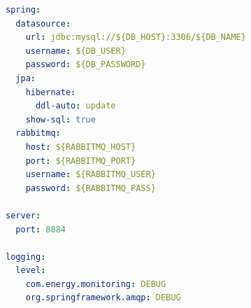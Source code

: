 \documentclass[12pt,a4paper]{article}
\begin{document}
\begin{lstlisting}[language=yaml]
spring:
  datasource:
    url: jdbc:mysql://${DB_HOST}:3306/${DB_NAME}
    username: ${DB_USER}
    password: ${DB_PASSWORD}
  jpa:
    hibernate:
      ddl-auto: update
    show-sql: true
  rabbitmq:
    host: ${RABBITMQ_HOST}
    port: ${RABBITMQ_PORT}
    username: ${RABBITMQ_USER}
    password: ${RABBITMQ_PASS}

server:
  port: 8084

logging:
  level:
    com.energy.monitoring: DEBUG
    org.springframework.amqp: DEBUG
\end{lstlisting}
\end{document}
